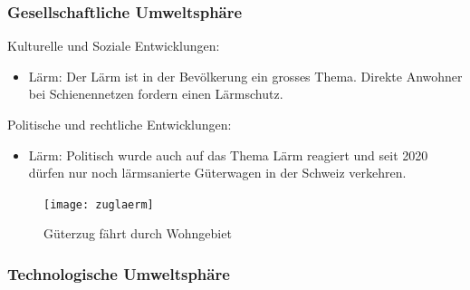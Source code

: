 \documentclass{article}
\begin{document}
\cleardoublepage
\subsubsection{Gesellschaftliche Umweltsphäre}

Kulturelle und Soziale Entwicklungen:
\begin{itemize}
\item Lärm: Der Lärm ist in der Bevölkerung ein grosses Thema. Direkte Anwohner bei Schienennetzen fordern einen Lärmschutz. 
\end{itemize}
Politische und rechtliche Entwicklungen:
\begin{itemize}
\item Lärm: Politisch wurde auch auf das Thema Lärm reagiert und seit 2020 dürfen nur noch lärmsanierte Güterwagen in der Schweiz verkehren.
\end{itemize}
\parencite[o. S.]{umwelt}

\begin{figure}[htbp] %
    \centering
    \texttt{[image: zuglaerm]} %
    \caption{Güterzug fährt durch Wohngebiet}\parencite[o. S.]{zuglaermBild}
    \label{fig:bildlabel4}
\end{figure}

\subsubsection{Technologische Umweltsphäre}
\end{document}
